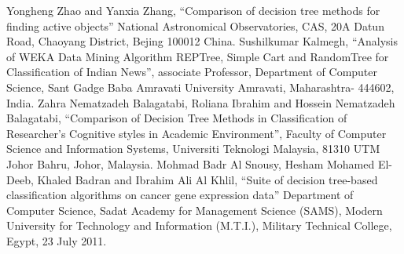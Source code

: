 \documentclass[conference]{IEEEtran}
\begin{document}
\begin{thebibliography}{00}
 Yongheng Zhao and Yanxia Zhang, ``Comparison of decision tree methods for finding active objects'' National Astronomical Observatories, CAS, 20A Datun Road, Chaoyang District, Bejing 100012 China.
 Sushilkumar Kalmegh, ``Analysis of WEKA Data Mining Algorithm REPTree, Simple Cart and RandomTree for Classification of Indian News'', associate Professor, Department of Computer Science, Sant Gadge Baba Amravati University
Amravati, Maharashtra- 444602, India.
 Zahra Nematzadeh Balagatabi, Roliana Ibrahim and Hossein Nematzadeh Balagatabi, ``Comparison of Decision Tree Methods in Classification of Researcher’s Cognitive styles in Academic Environment'', Faculty of Computer Science and Information Systems, Universiti Teknologi Malaysia, 81310 UTM Johor Bahru, Johor, Malaysia.
 Mohmad Badr Al Snousy, Hesham Mohamed El-Deeb, Khaled Badran and Ibrahim Ali Al Khlil, ``Suite of decision tree-based classification algorithms on cancer gene expression data'' Department of Computer Science, Sadat Academy for Management Science (SAMS), Modern University for Technology and Information (M.T.I.),  Military Technical College, Egypt, 23 July 2011.
\end{thebibliography}
\end{document}
